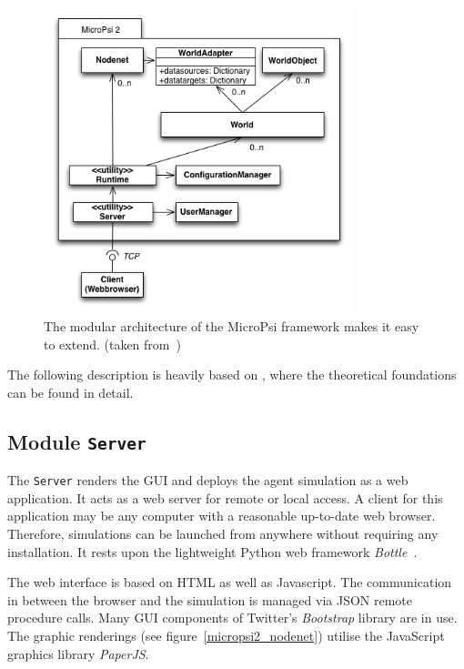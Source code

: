           
\begin{figure}[h]
  \centering
    \includegraphics[width=9cm]{graphics/UML_MicroPsi_v14}
  \caption{The modular architecture of the MicroPsi framework makes it easy to extend. (taken from~\cite{conf/agi/Bach12})}
  \label{micropsi2_modules}
\end{figure}

The following description is heavily based on \cite{conf/agi/Bach12}, where the theoretical foundations can be found in detail.

        \subsection{Module \texttt{Server}}
The \texttt{Server} renders the GUI and deploys the agent simulation as a web application. It acts as a web server for remote or local access. A client for this application may be any computer with a reasonable up-to-date web browser. Therefore, simulations can be launched from anywhere without requiring any installation. It rests upon the lightweight Python web framework \emph{Bottle}~\cite{bottlepy}.

The web interface is based on HTML as well as Javascript. The communication in between the browser and the simulation is managed via JSON remote procedure calls. Many GUI components of Twitter's \emph{Bootstrap} library are in use. The graphic renderings (see figure~\ref{micropsi2_nodenet}) utilise the JavaScript graphics library \emph{PaperJS}. 

